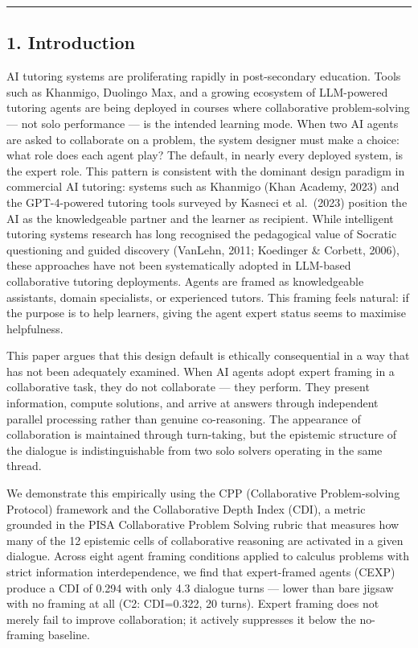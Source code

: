 \documentclass[
  11pt,
]{article}
\begin{document}
\begin{center}\rule{0.5\linewidth}{0.5pt}\end{center}

\subsection{1. Introduction}\label{introduction}

AI tutoring systems are proliferating rapidly in post-secondary
education. Tools such as Khanmigo, Duolingo Max, and a growing ecosystem
of LLM-powered tutoring agents are being deployed in courses where
collaborative problem-solving --- not solo performance --- is the
intended learning mode. When two AI agents are asked to collaborate on a
problem, the system designer must make a choice: what role does each
agent play? The default, in nearly every deployed system, is the expert
role. This pattern is consistent with the dominant design paradigm in commercial AI tutoring: systems such as Khanmigo (Khan Academy, 2023) and the GPT-4-powered tutoring tools surveyed by Kasneci et al.\ (2023) position the AI as the knowledgeable partner and the learner as recipient. While intelligent tutoring systems research has long recognised the pedagogical value of Socratic questioning and guided discovery (VanLehn, 2011; Koedinger \& Corbett, 2006), these approaches have not been systematically adopted in LLM-based collaborative tutoring deployments. Agents are framed as knowledgeable assistants, domain specialists,
or experienced tutors. This framing feels natural: if the purpose is to
help learners, giving the agent expert status seems to maximise helpfulness.

This paper argues that this design default is ethically consequential in
a way that has not been adequately examined. When AI agents adopt expert
framing in a collaborative task, they do not collaborate --- they
perform. They present information, compute solutions, and arrive at
answers through independent parallel processing rather than genuine
co-reasoning. The appearance of collaboration is maintained through
turn-taking, but the epistemic structure of the dialogue is
indistinguishable from two solo solvers operating in the same thread.

We demonstrate this empirically using the CPP (Collaborative
Problem-solving Protocol) framework and the Collaborative Depth Index
(CDI), a metric grounded in the PISA Collaborative Problem Solving
rubric that measures how many of the 12 epistemic cells of collaborative
reasoning are activated in a given dialogue. Across eight agent framing
conditions applied to calculus problems with strict information
interdependence, we find that expert-framed agents (CEXP) produce a CDI
of 0.294 with only 4.3 dialogue turns --- lower than bare jigsaw with no
framing at all (C2: CDI=0.322, 20 turns). Expert framing does not merely
fail to improve collaboration; it actively suppresses it below the
no-framing baseline.
\end{document}
